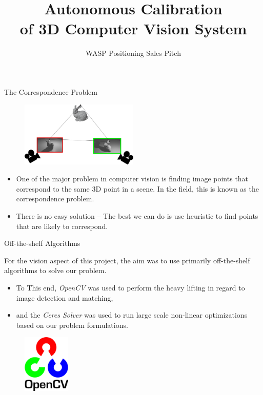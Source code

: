 \documentclass[aspectratio=43]{beamer}
\title[Autonomous Calibration]{\large {Autonomous Calibration}\\ of 3D Computer Vision System}
\date{WASP Positioning Sales Pitch}
\begin{document}
\begin{frame}
  \titlepage
\end{frame}

\begin{frame}{The Correspondence Problem}

  \begin{figure}
    \centering
    \includegraphics[width=0.5\textwidth]{img/correspond}
  \end{figure}

  \begin{itemize}
  \item One of the major problem in computer vision is finding image points that
    correspond to the same 3D point in a scene. In the field, this is known as the
    correspondence problem.
  \item There is no easy solution -- The best we can do is use heuristic to find
    points that are likely to correspond.
  \end{itemize}
\end{frame}


\begin{frame}{Off-the-shelf Algorithms}

  For the vision aspect of this project, the aim was to use primarily
  off-the-shelf algorithms to solve our problem.

  \begin{itemize}
  \item To This end, \emph{OpenCV} was used to perform the heavy lifting in
    regard to image detection and matching,
  \item and the \emph{Ceres Solver} was used to run large scale non-linear
    optimizations based on our problem formulations.
  \end{itemize}

  \begin{figure}
    \centering
    \includegraphics[width=0.2\textwidth]{img/opencv}
  \end{figure}

\end{frame}
\end{document}

